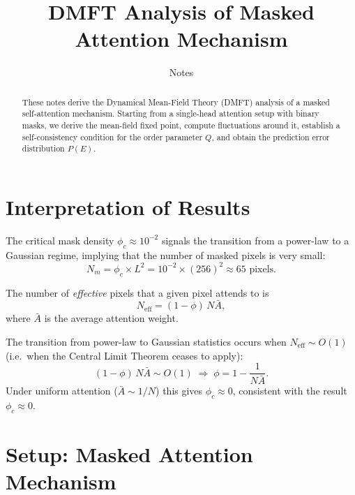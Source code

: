 \documentclass[aps,prb,onecolumn,showpacs,preprintnumbers,amsmath,amssymb]{revtex4-2}
\newcommand{\Neff}{N_{\mathrm{eff}}}
\begin{document}
\title{DMFT Analysis of Masked Attention Mechanism}

\author{Notes}
\date{}

\begin{abstract}
These notes derive the Dynamical Mean-Field Theory (DMFT) analysis of a masked
self-attention mechanism. Starting from a single-head attention setup with binary
masks, we derive the mean-field fixed point, compute fluctuations around it, establish a self-consistency condition for the order parameter $Q$, and obtain the prediction error distribution $P(E)$.
\end{abstract}

\maketitle

\section{Interpretation of Results}

The critical mask density $\phi_c \approx 10^{-2}$ signals the transition from a
power-law to a Gaussian regime, implying that the number of masked pixels is very
small:
\begin{equation}
    N_m = \phi_c \times L^2 = 10^{-2} \times (256)^2 \approx 65 \text{ pixels}.
\end{equation}

The number of \emph{effective} pixels that a given pixel attends to is
\begin{equation}
    \Neff = (1-\phi)\,N\bar{A},
\end{equation}
where $\bar{A}$ is the average attention weight.

The transition from power-law to Gaussian statistics occurs when $\Neff \sim O(1)$
(i.e.\ when the Central Limit Theorem ceases to apply):
\begin{equation}
    (1-\phi)\,N\bar{A} \sim O(1)
    \;\Longrightarrow\;
    \phi = 1 - \frac{1}{N\bar{A}}.
\end{equation}
Under uniform attention ($\bar{A} \sim 1/N$) this gives $\phi_c \approx 0$, consistent
with the result $\phi_c \approx 0$.

\section{Setup: Masked Attention Mechanism}
\end{document}
